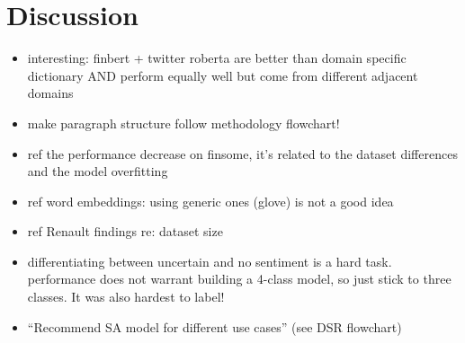 \section{Discussion}

\begin{itemize}[noitemsep]
	\item interesting: finbert + twitter roberta are better than domain specific dictionary AND perform equally well but come from different adjacent domains
	\item make paragraph structure follow methodology flowchart!
	\item ref the performance decrease on finsome, it's related to the dataset differences and the model overfitting
	\item ref word embeddings: using generic ones (glove) is not a good idea
	\item ref Renault findings re: dataset size
	\item differentiating between uncertain and no sentiment is a hard task. performance does not warrant building a 4-class model, so just stick to three classes. It was also hardest to label!
	\item ``Recommend SA model for different use cases'' (see DSR flowchart)
\end{itemize}